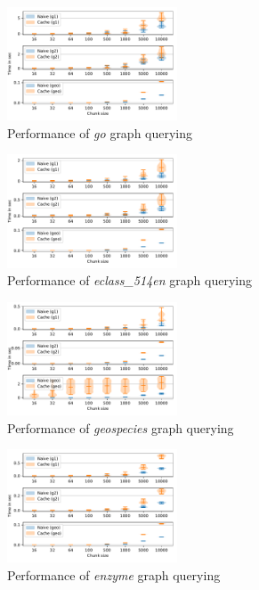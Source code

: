 \begin{figure}[h]
\centering
\includegraphics[width=0.45\textwidth]{data/raw/go.pdf}
\caption{Performance of \textit{go} graph querying}
\label{fig:python_go_all}
\end{figure}

\begin{figure}[h]
\centering
\includegraphics[width=0.45\textwidth]{data/raw/eclass_514en.pdf}
\caption{Performance of \textit{eclass\_514en} graph querying}
\label{fig:python_eclass_all}
\end{figure}

\begin{figure}[h]
\centering
\includegraphics[width=0.45\textwidth]{data/raw/geospecies.pdf}
\caption{Performance of \textit{geospecies} graph querying}
\label{fig:python_geospecies_all}
\end{figure}

\begin{figure}[h]
\centering
\includegraphics[width=0.45\textwidth]{data/raw/enzyme.pdf}
\caption{Performance of \textit{enzyme} graph querying}
\label{fig:python_enzyme_all}
\end{figure}

